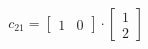 \documentclass[preview]{standalone}
\begin{document}
\begin{align*}
c_{21} = \begin{bmatrix} 1 & 0 \end{bmatrix} \cdot \begin{bmatrix} 1 \\ 2 \end{bmatrix}
\end{align*}
\end{document}
